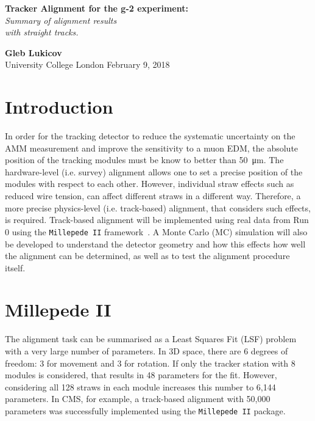 \documentclass[a4paper,11pt]{article}
\begin{document}
\thispagestyle{empty}
\begin{titlepage}
\begin{center}
\end{center}
\begin{center}
	\vspace{1cm}
	{\huge \textbf{Tracker Alignment for the g-2 experiment:} \\ \textit{Summary of alignment results \\ with straight tracks.}}\\
	\vspace{1.5cm}

	\vspace{6cm}
	{\LARGE\bf Gleb Lukicov}\\
	{\Large University College London}
	\vspace{4cm}
	\vfill
	\vspace{0.9cm}
	{\large February 9, 2018}
\end{center}
\end{titlepage}
\clearpage

\thispagestyle{plain}

\clearpage
\section{Introduction}
In order for the tracking detector to reduce the systematic uncertainty on the AMM measurement and improve the sensitivity to a muon EDM, the absolute position of the tracking modules must be know to better than \SI{50}{\micro\metre}. The hardware-level (i.e. survey) alignment allows one to set a precise position of the modules with respect to each other. However, individual straw effects such as reduced wire tension, can affect different straws in a different way. Therefore, a more precise physics-level (i.e. track-based) alignment, that considers such effects, is required. Track-based alignment will be implemented using real data from Run 0 using the \texttt{Millepede II} framework~\cite{mp2}. A Monte Carlo (MC) simulation will also be developed to understand the detector geometry and how this effects how well the alignment can be determined, as well as to test the alignment procedure itself. 

\section{Millepede II}
The alignment task can be summarised as a Least Squares Fit (LSF) problem with a very large number of parameters. In 3D space, there are 6 degrees of freedom: 3 for movement and 3 for rotation. If only the tracker station with 8 modules is considered, that results in 48 parameters for the fit. However, considering all 128 straws in each module increases this number to 6,144 parameters. In CMS, for example, a track-based alignment with 50,000 parameters was successfully implemented \cite{CMS} using the \texttt{Millepede II} package. 
\end{document}
